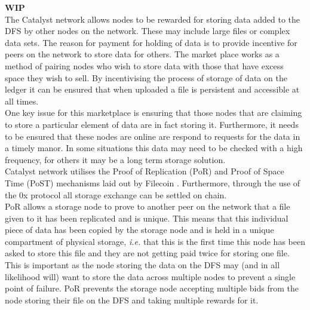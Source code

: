 \textbf{WIP} \\

The Catalyst network allows nodes to be rewarded for storing data added to the DFS by other nodes on the network. These may include large files or complex data sets. The reason for payment for holding of data is to provide incentive for peers on the network to store data for others. The market place works as a method of pairing nodes who wish to store data with those that have excess space they wish to sell. By incentivising the process of storage of data on the ledger it can be ensured that when uploaded a file is persistent and accessible at all times. \\

One key issue for this marketplace is ensuring that those nodes that are claiming to store a particular element of data are in fact storing it. Furthermore, it needs to be ensured that these nodes are online are respond to requests for the data in a timely manor. In some situations this data may need to be checked with a high frequency, for others it may be a long term storage solution. \\

Catalyst network utilises the Proof of Replication (PoR) and Proof of Space Time (PoST) mechanisms laid out by Filecoin \cite{benet2018filecoin}. Furthermore, through the use of the 0x protocol \cite{warren20170x} all storage exchange can be settled on chain.  \\

PoR allows a storage node to prove to another peer on the network that a file given to it has been replicated and is unique. This means that this individual piece of data has been copied by the storage node and is held in a unique compartment of physical storage, \textit{i.e.} that this is the first time this node has been asked to store this file and they are not getting paid twice for storing one file. This is important as the node storing the data on the DFS may (and in all likelihood will) want to store the data across multiple nodes to prevent a single point of failure. PoR prevents the storage node accepting multiple bids from the node storing their file on the DFS and taking multiple rewards for it. 